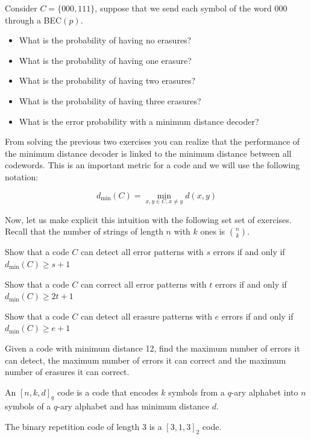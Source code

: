 \begin{exercise}
\label{ex:bec}
Consider $C=\{000,111\}$, suppose that we send each symbol of the word 000 through a BEC$(p)$.
\begin{itemize}
\item What is the probability of having no erasures?
\item What is the probability of having one erasure?
\item What is the probability of having two erasures?
\item What is the probability of having three erasures?
\item What is the error probability with a minimum distance decoder?
\end{itemize}
\end{exercise}

From solving the previous two exercises you can realize that the performance of the minimum distance decoder is linked to the minimum distance between all codewords. This is an important metric for a code and we will use the following notation:

\begin{equation}
d_{\min}(C)=\min_{x,y\in C,x\neq y}d(x,y)
\end{equation}

Now, let us make explicit this intuition with the following set set of exercises. Recall that the number of strings of length $n$ with $k$ ones is $n\choose k$.
\begin{exercise}
Show that a code $C$ can detect all error patterns with $s$ errors if and only if $d_{\min}(C)\geq s+1$
\end{exercise}
\begin{exercise}
Show that a code $C$ can correct all error patterns with $t$ errors if and only if $d_{\min}(C)\geq 2t+1$
\end{exercise}

\begin{exercise}
Show that a code $C$ can detect all erasure patterns with $e$ errors if and only if $d_{\min}(C)\geq e+1$
\end{exercise}

\begin{exercise}
Given a code with minimum distance 12, find the maximum number of errors it can detect, the maximum number of errors it can correct and the maximum number of erasures it can correct.
\end{exercise}

\begin{definition}
An $[n,k,d]_q$ code is a code that encodes $k$ symbols from a $q$-ary alphabet into $n$ symbols of a $q$-ary alphabet and has minimum distance $d$.
\end{definition}
\begin{example}
The binary repetition code of length 3 is a $[3,1,3]_2$ code.
\end{example}

